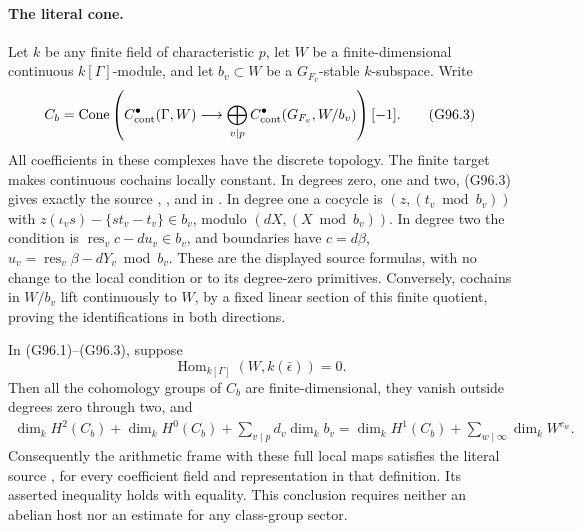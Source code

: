 \paragraph{The literal cone.}
Let \(k\) be any finite field of characteristic \(p\), let \(W\)
be a finite-dimensional continuous \(k[\Gamma]\)-module, and let
\(b_v\subset W\) be a \(G_{F_v}\)-stable \(k\)-subspace.  Write
\[
 C_b=\operatorname{Cone}\left(
 C^\bullet_{\rm cont}(\Gamma,W)\longrightarrow
 \bigoplus_{v\mid p}C^\bullet_{\rm cont}(G_{F_v},W/b_v)
 \right)[-1].
 \tag{G96.3}
\]
All coefficients in these complexes have the discrete topology.
The finite target makes continuous cochains locally constant.
In degrees zero, one and two, (G96.3) gives exactly the source
, , and  in
.  In degree one a cocycle is
\((z,(t_v\bmod b_v))\) with
\(z(\iota_v s)-\{s t_v-t_v\}\in b_v\), modulo
\((dX,(X\bmod b_v))\).  In degree two the condition is
\(\operatorname{res}_v c-du_v\in b_v\), and boundaries have
\(c=d\beta\), \(u_v=\operatorname{res}_v\beta-dY_v\bmod b_v\).
These are the displayed source formulas, with no change to the
local condition or to its degree-zero primitives.  Conversely,
cochains in \(W/b_v\) lift continuously to \(W\), by a fixed
linear section of this finite quotient, proving the identifications
in both directions.

\begin{theorem}
\label{AC-G96-EC}
In (G96.1)--(G96.3), suppose
\[
 \operatorname{Hom}_{k[\Gamma]}(W,k(\bar\epsilon))=0.
 \tag{G96.4}
\]
Then all the cohomology groups of \(C_b\) are finite-dimensional,
they vanish outside degrees zero through two, and
\[
 \begin{split}
 \dim_k H^2(C_b)+\dim_k H^0(C_b)
       +\sum_{v\mid p}d_v\dim_k b_v
  =\dim_k H^1(C_b)+\sum_{w\mid\infty}\dim_k W^{c_w}.
 \end{split}
 \tag{G96.5}
\]
Consequently the arithmetic frame with these full local maps
satisfies the literal source , for every coefficient
field and representation in that definition.  Its asserted
inequality holds with equality.  This conclusion requires neither
an abelian host nor an estimate for any class-group sector.
\end{theorem}

